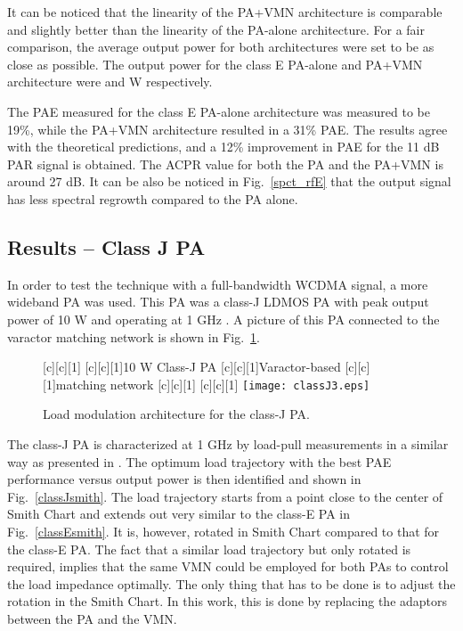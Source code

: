 \documentclass[10pt,journal]{IEEEtran}
\begin{document}
It can be noticed that the linearity of the PA+VMN architecture is comparable and slightly better than the linearity of the PA-alone architecture. For a fair comparison, the average output power for both architectures were set to be as close as possible. The output power for the class E PA-alone and PA+VMN architecture were  and  W respectively.

The PAE measured for the class E PA-alone architecture was measured to be 19\%, while the PA+VMN architecture resulted in a 31\% PAE. The results agree with the theoretical predictions, and a 12\% improvement in PAE for the 11 dB PAR signal is obtained. The ACPR value for both the PA and the PA+VMN is around 27 dB. It can be also be noticed in Fig.~\ref{spct_rfE} that the output signal has less spectral regrowth compared to the PA alone.

\subsection{Results -- Class J PA}
In order to test the technique with a full-bandwidth WCDMA signal, a more wideband PA was used. This PA was a class-J LDMOS PA with peak output power of 10 W and operating at 1 GHz \cite{classJ}. A picture of this PA connected to the varactor matching network is shown in Fig.~\ref{classJ}.

\begin{figure}
\centering
{}[c][c][1]{} [c][c][1]{10 W Class-J PA} [c][c][1]{Varactor-based} [c][c][1]{matching network} [c][c][1]{} [c][c][1]{}
\texttt{[image: classJ3.eps]}
\caption{Load modulation architecture for the class-J PA.}
\label{classJ}
\end{figure}

The class-J PA \cite{classJ} is characterized at 1 GHz by load-pull measurements in a similar way as presented in \cite{hosseinMTT,hosseinEMW}. The optimum load trajectory with the best PAE performance versus output power is then identified and shown in Fig.~\ref{classJsmith}. The load trajectory starts from a point close to the center of Smith Chart and extends out very similar to the class-E PA in Fig.~\ref{classEsmith}. It is, however, rotated in Smith Chart compared to that for the class-E PA. The fact that a similar load trajectory but only rotated is required, implies that the same VMN could be employed for both PAs to control the load impedance optimally. The only thing that has to be done is to adjust the rotation in the Smith Chart. In this work, this is done by replacing the adaptors between the PA and the VMN.
\end{document}
